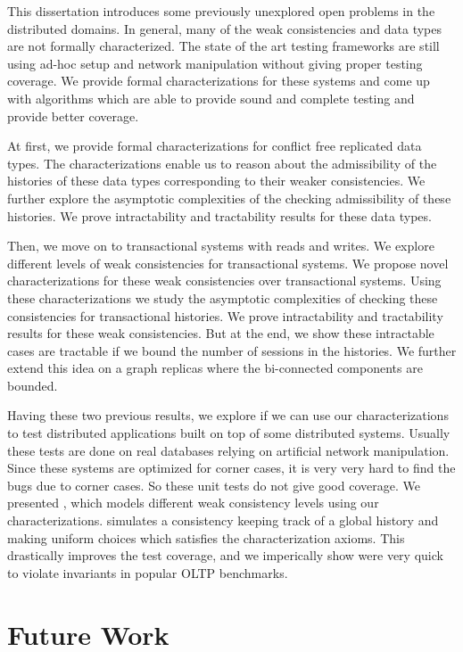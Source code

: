 
This dissertation introduces some previously unexplored open problems in the distributed domains. In general, many of the weak consistencies and data types are not formally characterized. The state of the art testing frameworks are still using ad-hoc setup and network manipulation without giving proper testing coverage. We provide formal characterizations for these systems and come up with algorithms which are able to provide sound and complete testing and provide better coverage.

At first, we provide formal characterizations for conflict free replicated data types. The characterizations enable us to reason about the admissibility of the histories of these data types corresponding to their weaker consistencies. We further explore the asymptotic complexities of the checking admissibility of these histories. We prove intractability and tractability results for these data types.

Then, we move on to transactional systems with reads and writes. We explore different levels of weak consistencies for transactional systems. We propose novel characterizations for these weak consistencies over transactional systems. Using these characterizations we study the asymptotic complexities of checking these consistencies for transactional histories. We prove intractability and tractability results for these weak consistencies. But at the end, we show these intractable cases are tractable if we bound the number of sessions in the histories. We further extend this idea on a graph replicas where the bi-connected components are bounded.

Having these two previous results, we explore if we can use our characterizations to test distributed applications built on top of some distributed systems. Usually these tests are done on real databases relying on artificial network manipulation. Since these systems are optimized for corner cases, it is very very hard to find the bugs due to corner cases. So these unit tests do not give good coverage. We presented \tool{}, which models different weak consistency levels using our characterizations. \tool{} simulates a consistency keeping track of a global history and making uniform choices which satisfies the characterization axioms. This drastically improves the test coverage, and we imperically show \tool{} were very quick to violate invariants in popular OLTP benchmarks.

\section{Future Work}

